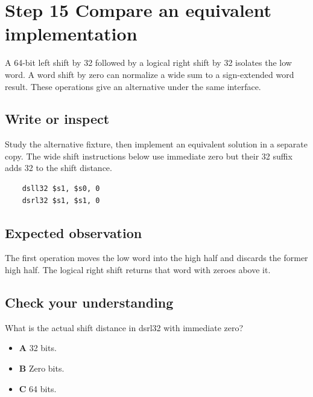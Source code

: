\section{Step 15 Compare an equivalent
  implementation}\label{004-bit-inspector-s15-step-15-compare-an-equivalent-implementation}

A 64-bit left shift by 32 followed by a logical right shift by 32
isolates the low word. A word shift by zero can normalize a wide sum to
a sign-extended word result. These operations give an alternative under
the same interface.

\subsection{Write or
  inspect}\label{004-bit-inspector-s15-write-or-inspect}

Study the alternative fixture, then implement an equivalent solution in
a separate copy. The wide shift instructions below use immediate zero
but their 32 suffix adds 32 to the shift distance.

\begin{verbatim}
    dsll32 $s1, $s0, 0
    dsrl32 $s1, $s1, 0
\end{verbatim}

\subsection{Expected
  observation}\label{004-bit-inspector-s15-expected-observation}

The first operation moves the low word into the high half and discards
the former high half. The logical right shift returns that word with
zeroes above it.

\subsection{Check your
  understanding}\label{004-bit-inspector-s15-check-your-understanding}

What is the actual shift distance in dsrl32 with immediate zero?

\begin{itemize}
  \tightlist
  \item
        \textbf{A} 32 bits.
  \item
        \textbf{B} Zero bits.
  \item
        \textbf{C} 64 bits.
\end{itemize}
